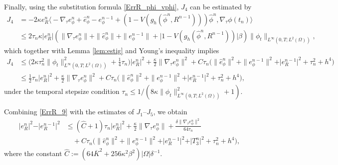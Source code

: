 \documentclass{m2an}
\begin{document}
Finally, using the substitution formula \eqref{ErrR_phi_vphi}, $ J_{4} $ can be estimated by
\begin{equation*}
	\begin{aligned}
		J_4 & = - 2 \kappa e_R^{n} \big\langle -\nabla_{\tau} e_{\phi}^{n} + \hat{e}_{\phi}^{n} - e_{\phi}^{n-1} + ( 1 - V ( g_h(\hat{\phi}^{n}, R^{n-1}) ) ) \hat{\phi}^{n}, \nabla_{\tau} \phi( t_n )  \big\rangle \\
		& \leq 2 \tau_{n} \kappa \vert e_R^{n} \vert \left( \| \nabla_{\tau} e_{\phi}^{n} \| + \| \hat{e}_{\phi}^{n} \| + \| e_{\phi}^{n-1} \| + \big\vert 1 - V ( g_h(\hat{\phi}^{n}, R^{n-1}) ) \big\vert \beta \right) \| \phi_{t} \|_{ L^{\infty}( 0,T;L^{2}(\Omega) ) },
	\end{aligned}
\end{equation*}
which together with Lemma \ref{lem:estig}  and Young's inequality implies
\begin{equation*}\label{ErrR_12}
	\begin{aligned}
		J_4 & \leq \Big( 2 \kappa \tau_{n}^2 \| \phi_{t} \|_{ L^{\infty}( 0,T;L^{2}(\Omega) ) }^{2} + \frac{1}{4} \tau_{n} \Big) \vert e_R^{n} \vert^2  
		+ \frac{\kappa}{2} \| \nabla_{\tau} e_{\phi}^{n} \|^2   + C \tau_{n } \Big( \| \hat{e}_{\phi}^{n} \|^2 + \| e_{\phi}^{n-1} \|^2 + \vert e_{R}^{n-1} \vert^2 + \tau_{n}^{2} + h^4 \Big) \\
		& \leq \frac{1}{2} \tau_{n} \vert e_R^{n} \vert^2  + \frac{\kappa}{2} \| \nabla_{\tau} e_{\phi}^{n} \|^2 
		+ C \tau_{n } \Big( \| \hat{e}_{\phi}^{n} \|^2 + \| e_{\phi}^{n-1} \|^2 + \vert e_{R}^{n-1} \vert^2 + \tau_{n}^{2} + h^4 \Big),
	\end{aligned}
\end{equation*}
under the temporal stepsize condition $ \tau_{n} \leq  1 / (8\kappa \| \phi_{t} \|_{ L^{\infty}(0,T;L^{2}(\Omega)) }^2 + 1)$.

Combining \eqref{ErrR_9} with the estimates of $J_{1}$--$J_{5}$, we obtain
\begin{equation}\label{ErrR_13}
	\begin{aligned}
		\vert e_R^{n} \vert^2 - \vert e_R^{n-1} \vert^2 & \leq  ( \hat{C} + 1 ) \tau_{n} \vert e_R^{n} \vert^2 + \frac{\kappa}{2} \| \nabla_{\tau} e_{\phi}^{n} \| + \frac{ \delta \| \nabla_{\tau} e_\phi^{n} \|^2 }{64 \tau_{n} } \\
		& \quad + C \tau_{n} \big( \| \hat{e}_\phi^{n} \|^2 + \| e_{\phi}^{n-1} \|^2 + \vert e_R^{n-1} \vert^2 + \vert T_3^n \vert^2 + \tau_{n}^2 + h^4 \big),
	\end{aligned}
\end{equation}
where the constant $ \hat{C} := ( 64 \overline{K}^2 + 256  \kappa^2 \beta^2)   \vert \Omega \vert \delta^{-1}$.
\end{document}
